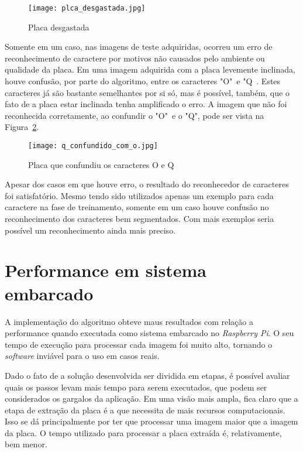 \begin{figure}[H]
	\centering
	\texttt{[image: plca\_desgastada.jpg]}
	\caption{Placa desgastada}
	\label{fig:placa_desgastada}
\end{figure}

Somente em um caso, nas imagens de teste adquiridas, ocorreu um erro de
reconhecimento de caractere por motivos não causados pelo ambiente ou qualidade
da placa. Em uma imagem adquirida com a placa levemente inclinada, houve
confusão, por parte do algoritmo, entre os caracteres "O"~e "Q~. Estes
caracteres já são bastante semelhantes por si só, mas é possível, também, que o
fato de a placa estar inclinada tenha amplificado o erro. A imagem que não foi
reconhecida corretamente, ao confundir o "O"~e o "Q", pode ser vista na
Figura~\ref{fig:q_confundido_com_o}.

\begin{figure}[H]
	\centering
	\texttt{[image: q\_confundido\_com\_o.jpg]}
	\caption{Placa que confundiu os caracteres O e Q}
	\label{fig:q_confundido_com_o}
\end{figure}

Apesar dos casos em que houve erro, o resultado do reconhecedor de caracteres
foi satisfatório. Mesmo tendo sido utilizados apenas um exemplo para cada
caractere na fase de treinamento, somente em um caso houve confusão no
reconhecimento dos caracteres bem segmentados. Com mais exemplos seria possível
um reconhecimento ainda mais preciso.

\section{Performance em sistema embarcado}
\label{sec:performance_resultados}

A implementação do algoritmo obteve maus resultados com relação a
performance quando executada como sistema embarcado no \emph{Raspberry Pi}.
O seu tempo de execução para processar cada imagem foi muito alto, tornando o \emph{software}
inviável para o uso em casos reais.

Dado o fato de a solução desenvolvida ser dividida em etapas, é possível avaliar
quais os passos levam mais tempo para serem executados, que podem ser
considerados os gargalos da aplicação. Em uma visão mais ampla, fica claro que a
etapa de extração da placa é a que necessita de mais recursos computacionais.
Isso se dá principalmente por ter que processar uma imagem maior que a imagem da
placa. O tempo utilizado para processar a placa extraída é, relativamente, bem
menor.


